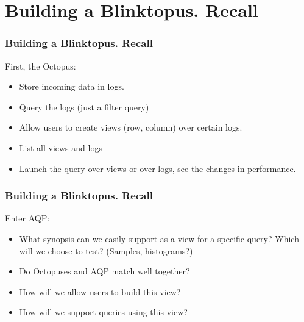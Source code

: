 \documentclass{beamer}
\begin{document}
\section{Building a Blinktopus. Recall}
\begin{frame}
\frametitle{Building a Blinktopus. Recall}
First, the Octopus:
\begin{itemize}
\item{Store incoming data in logs.}
\item{Query the logs (just a filter query)}
\item{Allow users to create views (row, column) over certain logs.}
\item{List all views and logs}
\item{Launch the query over views or over logs, see the changes in performance.}
\end{itemize}
\end{frame}
\begin{frame}
\frametitle{Building a Blinktopus. Recall}
Enter AQP:
\begin{itemize}
\item{What synopsis can we easily support as a view for a specific query? Which will we choose to test? (Samples, histograms?)}
\item{Do Octopuses and AQP match well together?}
\item{How will we allow users to build this view?}
\item{How will we support queries using this view?}\\
\end{itemize}
\end{frame}
\end{document}
